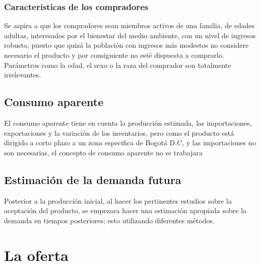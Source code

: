 \documentclass[letterpaper,12pt]{scrreprt}
\begin{document}
    \subsection{Características de los compradores}
    Se aspira a que los compradores sean miembros activos de una familia, de edades adultas, interesados por el bienestar del medio ambiente, con un nivel de ingresos robusto, puesto que quizá la población con ingresos más modestos no considere necesario el producto y por consiguiente no esté dispuesta a comprarlo. Parámetros como la edad, el sexo o la raza del comprador son totalmente irrelevantes.

    \section{Consumo aparente}
    El consumo aparente tiene en cuenta la producción estimada, las importaciones, exportaciones y la variación de los inventarios, pero como el producto está dirigido a corto plazo a un zona especifica de Bogotá D.C, y las importaciones no son necesarias, el concepto de consumo aparente no se trabajara

    \section{Estimación de la demanda futura}
    Posterior a la producción inicial, al hacer los pertinentes estudios sobre la aceptación del producto, se empezara hacer una estimación apropiada sobre la demanda en tiempos posteriores; esto utilizando diferentes métodos.

\chapter{La oferta}
\end{document}
